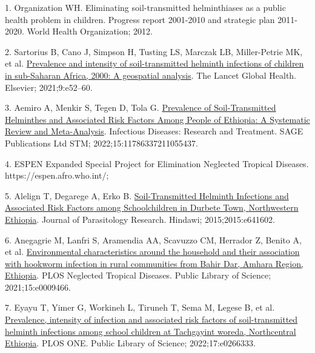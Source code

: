 \documentclass[
]{article}
\newlength{\cslhangindent}
\newlength{\cslentryspacingunit} %
\newenvironment{CSLReferences}[2] %
 {%
  \setlength{\parindent}{0pt}
  \ifodd #1
  \let\oldpar\par
  \def\par{\hangindent=\cslhangindent\oldpar}
  \fi
  \setlength{\parskip}{#2\cslentryspacingunit}
 }%
 {}
\begin{document}
\hypertarget{refs}{}
\begin{CSLReferences}{0}{0}
\leavevmode{}%
1. Organization WH. Eliminating soil-transmitted helminthiases as a
public health problem in children. {Progress} report 2001-2010 and
strategic plan 2011-2020. {World Health Organization}; 2012.

\leavevmode{}%
2. Sartorius B, Cano J, Simpson H, Tusting LS, Marczak LB, Miller-Petrie
MK, et al.
\href{https://doi.org/10.1016/S2214-109X(20)30398-3}{Prevalence and
intensity of soil-transmitted helminth infections of children in
sub-{Saharan Africa}, 2000: A geospatial analysis}. The
Lancet Global Health. {Elsevier}; 2021;9:e52--60.

\leavevmode{}%
3. Aemiro A, Menkir S, Tegen D, Tola G.
\href{https://doi.org/10.1177/11786337211055437}{Prevalence of
{Soil-Transmitted Helminthes} and {Associated Risk Factors Among People}
of {Ethiopia}: {A Systematic Review} and {Meta-Analysis}}. Infectious
Diseases: Research and Treatment. {SAGE Publications Ltd STM};
2022;15:11786337211055437.

\leavevmode{}%
4. {ESPEN} \textbar{} {Expanded Special Project} for {Elimination
Neglected Tropical Diseases}. https://espen.afro.who.int/;

\leavevmode{}%
5. Alelign T, Degarege A, Erko B.
\href{https://doi.org/10.1155/2015/641602}{Soil-{Transmitted Helminth
Infections} and {Associated Risk Factors} among {Schoolchildren} in
{Durbete Town}, {Northwestern Ethiopia}}. Journal of Parasitology
Research. {Hindawi}; 2015;2015:e641602.

\leavevmode{}%
6. Anegagrie M, Lanfri S, Aramendia AA, Scavuzzo CM, Herrador Z, Benito
A, et al.
\href{https://doi.org/10.1371/journal.pntd.0009466}{Environmental
characteristics around the household and their association with hookworm
infection in rural communities from {Bahir Dar}, {Amhara Region},
{Ethiopia}}. PLOS Neglected Tropical Diseases. {Public Library of
Science}; 2021;15:e0009466.

\leavevmode{}%
7. Eyayu T, Yimer G, Workineh L, Tiruneh T, Sema M, Legese B, et al.
\href{https://doi.org/10.1371/journal.pone.0266333}{Prevalence,
intensity of infection and associated risk factors of soil-transmitted
helminth infections among school children at {Tachgayint} woreda,
{Northcentral Ethiopia}}. PLOS ONE. {Public Library of Science};
2022;17:e0266333.

\end{CSLReferences}
\end{document}
